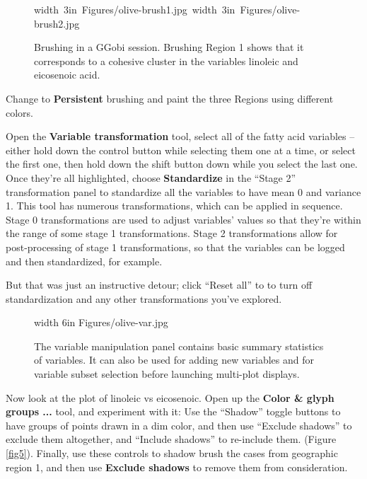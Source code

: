 \documentclass[11pt]{article}
\begin{document}
\begin{figure}[htp]
\hbox{\pdfimage width 3in {Figures/olive-brush1.jpg}
      \pdfimage width 3in {Figures/olive-brush2.jpg}
}
\caption{Brushing in a GGobi session. Brushing Region 1 shows that it
corresponds to a cohesive cluster in the variables linoleic and 
eicosenoic acid.
}
\label{fig3}
\end{figure}

Change to {\bf Persistent} brushing and paint the three Regions
using different colors. 

Open the {\bf Variable transformation} tool, select all of the fatty
acid variables -- either hold down the control button while selecting
them one at a time, or select the first one, then hold down the
shift button down while you select the last one.  Once they're all
highlighted, choose {\bf Standardize} in the ``Stage 2'' transformation
panel to standardize all the variables to have mean 0 and variance 1.
This tool has numerous transformations, which can be applied in sequence.
Stage 0 transformations are used to adjust variables' values so that
they're within the range of some stage 1 transformations. Stage 2
transformations allow for post-processing of stage 1 transformations,
so that the variables can be logged and then standardized, for example.

But that was just an instructive detour; click ``Reset all'' to
to turn off standardization and any other transformations you've
explored.

\begin{figure}[htp]
\pdfimage width 6in {Figures/olive-var.jpg}
\caption{The variable manipulation panel contains basic summary 
statistics of variables. It can also be used for adding new variables
and for variable subset selection before launching multi-plot
displays.
}%
\label{fig4}
\end{figure}

Now look at the plot of linoleic vs eicosenoic. Open up the {\bf
Color \& glyph groups ...} tool, and experiment with it:  Use the
``Shadow'' toggle buttons to have groups of points drawn in a dim
color, and then use ``Exclude shadows'' to exclude them altogether,
and ``Include shadows'' to re-include them.  (Figure \ref{fig5}).
Finally, use these controls to shadow brush the cases from geographic
region 1, and then use {\bf Exclude shadows} to remove them from
consideration.
\end{document}
